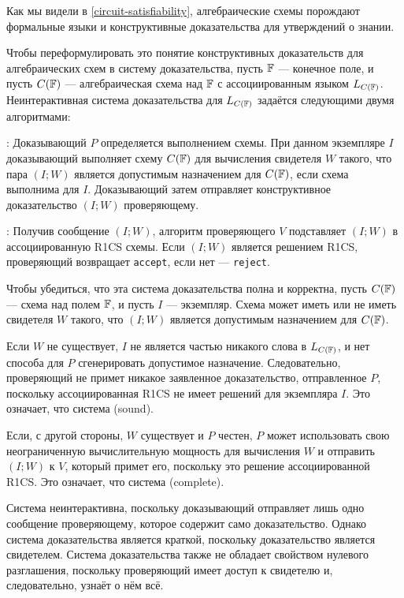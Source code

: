 \begin{example} Как мы видели в \ref{circuit-satisfiability}, алгебраические схемы порождают формальные языки и конструктивные доказательства для утверждений о знании.

Чтобы переформулировать это понятие конструктивных доказательств для алгебраических схем в систему доказательства, пусть $\mathbb{F}$ --- конечное поле, и пусть $C(\mathbb{F})$ --- алгебраическая схема над $\mathbb{F}$ с ассоциированным языком $L_{C(\mathbb{F})}$. Неинтерактивная система доказательства для $L_{C(\mathbb{F})}$ задаётся следующими двумя алгоритмами:

: Доказывающий $P$ определяется выполнением схемы. При данном экземпляре $I$ доказывающий выполняет схему $C(\mathbb{F})$ для вычисления свидетеля $W$ такого, что пара $(I;W)$ является допустимым назначением для $C(\mathbb{F})$, если схема выполнима для $I$. Доказывающий затем отправляет конструктивное доказательство $(I;W)$ проверяющему.

: Получив сообщение $(I;W)$, алгоритм проверяющего $V$ подставляет $(I;W)$ в ассоциированную R1CS схемы. Если $(I;W)$ является решением R1CS, проверяющий возвращает \texttt{accept}, если нет --- \texttt{reject}.

Чтобы убедиться, что эта система доказательства полна и корректна, пусть $C(\mathbb{F})$ --- схема над полем $\mathbb{F}$, и пусть $I$ --- экземпляр. Схема может иметь или не иметь свидетеля $W$ такого, что $(I;W)$ является допустимым назначением для $C(\mathbb{F})$.

Если $W$ не существует, $I$ не является частью никакого слова в $L_{C(\mathbb{F})}$, и нет способа для $P$ сгенерировать допустимое назначение. Следовательно, проверяющий не примет никакое заявленное доказательство, отправленное $P$, поскольку ассоциированная R1CS не имеет решений для экземпляра $I$. Это означает, что система  (sound).

Если, с другой стороны, $W$ существует и $P$ честен, $P$ может использовать свою неограниченную вычислительную мощность для вычисления $W$ и отправить $(I;W)$ к $V$, который примет его, поскольку это решение ассоциированной R1CS. Это означает, что система  (complete).

Система неинтерактивна, поскольку доказывающий отправляет лишь одно сообщение проверяющему, которое содержит само доказательство. Однако система доказательства  является краткой, поскольку доказательство является свидетелем. Система доказательства также не обладает свойством нулевого разглашения, поскольку проверяющий имеет доступ к свидетелю и, следовательно, узнаёт о нём всё.
\end{example}
